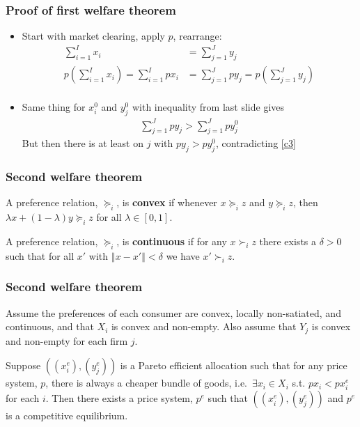 \documentclass[compress]{beamer}
\newcommand{\norm}[1]{\left\Vert {#1} \right\Vert}
\newcommand{\prefeq}{\succeq}
\newcommand{\pref}{\succ}
\begin{document}
\begin{frame}
  \frametitle{Proof of first welfare theorem}
  \begin{itemize}
  \item Start with market clearing, apply $p$, rearrange:
    \begin{align}
      \sum_{i=1}^I x_i & = \sum_{j=1}^J y_j  \\
      p(\sum_{i=1}^I x_i) =  \sum_{i=1}^I p x_i & 
      = \sum_{j=1}^J p y_j  = p(\sum_{j=1}^J y_j)  \\ 
    \end{align}
  \item Same thing for $x_i^0$ and $y_j^0$ with inequality from last
    slide gives
    \begin{align}
      \sum_{j=1}^J p y_j > \sum_{j=1}^J p y_j^0 
    \end{align}
    But then there is at least on $j$ with $p y_j > p y_j^0$,
    contradicting \ref{c3}
  \end{itemize}  
\end{frame}

\begin{frame}
  \frametitle{Second welfare theorem}
  \begin{definition}
    A preference relation, $\prefeq_i$, is \textbf{convex} if whenever $x
    \prefeq_i z$ and $y \prefeq_i z$, then $\lambda x + (1-\lambda) y
    \prefeq_i z$ for all $\lambda \in [0,1]$. 
  \end{definition}
  
  \begin{definition}
    A preference relation, $\prefeq_i$, is \textbf{continuous} if
    for any  $x \pref_i z$ there exists a $\delta >
    0$ such that for all $x'$ with $\norm{x - x'}<\delta$ we have $x'
    \pref_i z$.
  \end{definition}
\end{frame}

\begin{frame}
  \frametitle{Second welfare theorem}
  \begin{theorem}
    Assume the preferences of each consumer are convex, locally
    non-satiated, and continuous, and that $X_i$ is convex and
    non-empty.  
    Also assume that $Y_j$ is convex and non-empty for each
    firm $j$. 
    
    Suppose $((x_i^e), (y_j^e))$ is a Pareto efficient allocation such
    that for any price system, $p$, there is always a cheaper bundle of
    goods, i.e.\ $\exists x_i \in X_i$ s.t. $p x_i < p x_i^e$ for each
    $i$. Then there exists a price system, $p^e$ such that $((x_i^e),
    (y_j^e))$ and $p^e$ is a competitive equilibrium.
  \end{theorem}  
\end{frame}
\end{document}
